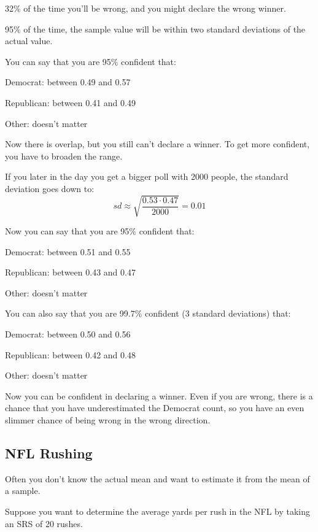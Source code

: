 \documentclass[landscape]{exam}
\begin{document}
  32\% of the time you'll be wrong, and you might declare the wrong winner.

  95\% of the time, the sample value will be within two standard deviations of
  the actual value. 
  
  You can say that you are 95\% confident that:
  \begin{itemize*}
    \item Democrat: between 0.49 and 0.57
    \item Republican: between 0.41 and 0.49
    \item Other: doesn't matter
  \end{itemize*}

  Now there is overlap, but you still can't declare a winner. To get more
  confident, you have to broaden the range.

  If you later in the day you get a bigger poll with 2000 people, the standard
  deviation goes down to:
  \[
    sd \approx \sqrt{\frac{0.53 \cdot 0.47}{2000}} = 0.01
  \]

  Now you can say that you are 95\% confident that:
  \begin{itemize*}
    \item Democrat: between 0.51 and 0.55
    \item Republican: between 0.43 and 0.47
    \item Other: doesn't matter
  \end{itemize*}

  You can also say that you are 99.7\% confident (3 standard deviations) that:
  \begin{itemize*}
    \item Democrat: between 0.50 and 0.56
    \item Republican: between 0.42 and 0.48
    \item Other: doesn't matter
  \end{itemize*}

  Now you can be confident in declaring a winner. Even if you are wrong, there
  is a chance that you have underestimated the Democrat count, so you have an
  even slimmer chance of being wrong in the wrong direction.

  \subsection{NFL Rushing}
  Often you don't know the actual mean and want to estimate it from the mean of
  a sample.

  Suppose you want to determine the average yards per rush in the NFL by taking
  an SRS of 20 rushes.
\end{document}

